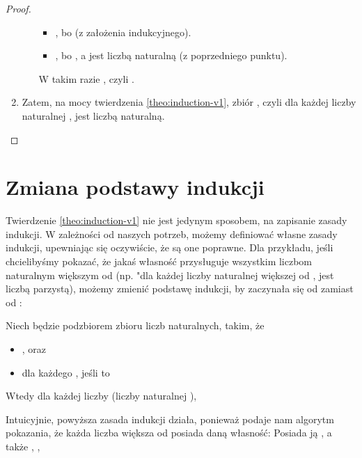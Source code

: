 \begin{example}
\begin{proof}
\begin{enumerate}
\begin{itemize}
                \begin{itemize}
                    \item {}, bo  (z założenia indukcyjnego).
                    \item {}, bo , a  jest liczbą naturalną (z poprzedniego punktu).
                \end{itemize}
                
                W takim razie , czyli .
        \end{itemize}
    
    \item Zatem, na mocy twierdzenia \ref{theo:induction-v1}, zbiór , czyli dla każdej liczby naturalnej ,  jest liczbą naturalną. 
\end{enumerate}
\end{proof}
\end{example}

\section{Zmiana podstawy indukcji}

Twierdzenie \ref{theo:induction-v1} nie jest jedynym sposobem, na zapisanie zasady indukcji. W zależności od naszych potrzeb, możemy definiować własne zasady indukcji, upewniając się oczywiście, że są one poprawne. Dla przykładu, jeśli chcielibyśmy pokazać, że jakaś własność przysługuje wszystkim liczbom naturalnym większym od  (np. "dla każdej liczby naturalnej większej od ,  jest liczbą parzystą), możemy zmienić podstawę indukcji, by zaczynała się od  zamiast od :

\begin{theo}
Niech  będzie podzbiorem zbioru liczb naturalnych, takim, że 
\begin{itemize}
    \item {}, oraz
    \item dla każdego , jeśli  to 
\end{itemize}
Wtedy dla każdej liczby  (liczby naturalnej ), 
\label{theo:induction-v2}
\end{theo}

Intuicyjnie, powyższa zasada indukcji działa, ponieważ podaje nam algorytm pokazania, że każda liczba większa od  posiada daną własność: Posiada ją , a także , , \m{\ldots}

